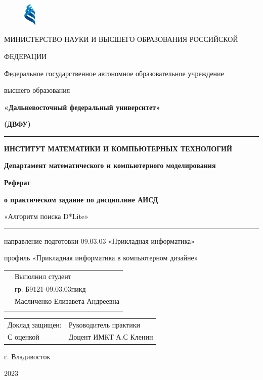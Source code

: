 \documentclass[12pt]{article}
\begin{document}
\begin{titlepage}
\begin{figure}
    \begin{center}
        \includegraphics[width=0.06\textwidth]{img/znachok_dvfu.png}
    \end{center}
\end{figure}
\thispagestyle{empty}

\begin{small}

\renewcommand{\baselinestretch}{2.0} %
\centerline{\large{МИНИСТЕРСТВО НАУКИ И ВЫСШЕГО ОБРАЗОВАНИЯ РОССИЙСКОЙ}}
\centerline{\large{ФЕДЕРАЦИИ}}
\centerline{Федеральное государственное автономное образовательное учреждение}
\centerline{высшего образования}
\centerline{\textbf{«Дальневосточный федеральный университет»}}
\centerline{\textbf{(ДВФУ)}}

\noindent\rule{\textwidth}{4pt}
\specialrule{.1em}{.05em}{.05em}

\centerline{\textbf{ИНСТИТУТ МАТЕМАТИКИ И КОМПЬЮТЕРНЫХ ТЕХНОЛОГИЙ}}
\centerline{\textbf{Департамент математического и компьютерного моделирования}}

\vfill

\vfill

\centerline{\textbf{Реферат}}
\centerline{\textbf{о практическом задание по дисциплине АИСД}}
\centerline{«Алгоритм поиска D*Lite»}
\par\noindent\rule{\textwidth}{0.3pt}
\centerline{направление подготовки 09.03.03 «Прикладная информатика»}
\centerline{профиль «Прикладная информатика в компьютерном дизайне»}

\vfill

\vfill

\noindent
\begin{tabular}{p{} p{}}
 & Выполнил студент  \\
 &  гр. Б9121-09.03.03пикд \\
 & Масличенко Елизавета Андреевна  \\
 & \parindent0pt \\
\end{tabular}

\vfill
\noindent
\begin{tabular}{p{} p{}}
 Доклад защищен:& Руководитель практики  \\
 С оценкой \hrulefill & Доцент ИМКТ А.С Кленин  \\
 
\end{tabular}

\noindent


\vfill

\centerline{г. Владивосток}
\centerline{2023}
\clearpage
\end{small}
\end{titlepage}
\newpage
\end{document}
